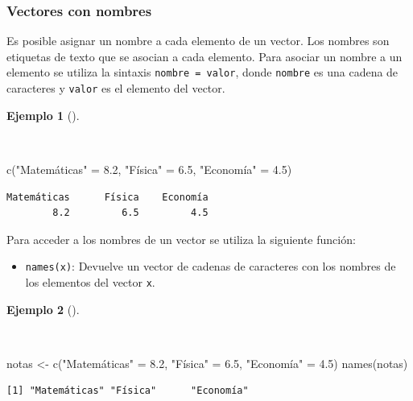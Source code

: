 \documentclass[
  a4paper,
]{scrreport}
\newenvironment{Shaded}{\begin{snugshade}}{\end{snugshade}}
\newcommand{\FloatTok}[1]{\textcolor[rgb]{0.68,0.00,0.00}{#1}}
\newcommand{\FunctionTok}[1]{\textcolor[rgb]{0.28,0.35,0.67}{#1}}
\newcommand{\NormalTok}[1]{\textcolor[rgb]{0.00,0.23,0.31}{#1}}
\newcommand{\OtherTok}[1]{\textcolor[rgb]{0.00,0.23,0.31}{#1}}
\newcommand{\StringTok}[1]{\textcolor[rgb]{0.13,0.47,0.30}{#1}}
\providecommand{\tightlist}{%
  \setlength{\itemsep}{0pt}\setlength{\parskip}{0pt}}\usepackage{longtable,booktabs,array}
\theoremstyle{definition}
\theoremstyle{definition}
\newtheorem{example}{Ejemplo}[chapter]
\theoremstyle{remark}
\begin{document}
\subsubsection{Vectores con nombres}\label{vectores-con-nombres}

Es posible asignar un nombre a cada elemento de un vector. Los nombres
son etiquetas de texto que se asocian a cada elemento. Para asociar un
nombre a un elemento se utiliza la sintaxis \texttt{nombre\ =\ valor},
donde \texttt{nombre} es una cadena de caracteres y \texttt{valor} es el
elemento del vector.

\begin{example}[]\protect\hypertarget{exm-vectores-con-nombre}{}\label{exm-vectores-con-nombre}

~

\begin{Shaded}
\begin{Highlighting}[]
\FunctionTok{c}\NormalTok{(}\StringTok{"Matemáticas"} \OtherTok{=} \FloatTok{8.2}\NormalTok{, }\StringTok{"Física"} \OtherTok{=} \FloatTok{6.5}\NormalTok{, }\StringTok{"Economía"} \OtherTok{=} \FloatTok{4.5}\NormalTok{)}
\end{Highlighting}
\end{Shaded}

\begin{verbatim}
Matemáticas      Física    Economía 
        8.2         6.5         4.5 
\end{verbatim}

\end{example}

Para acceder a los nombres de un vector se utiliza la siguiente función:

\begin{itemize}
\tightlist
\item
  \texttt{names(x)}: Devuelve un vector de cadenas de caracteres con los
  nombres de los elementos del vector \texttt{x}.
\end{itemize}

\begin{example}[]\protect\hypertarget{exm-acceso-nombres-vector}{}\label{exm-acceso-nombres-vector}

~

\begin{Shaded}
\begin{Highlighting}[]
\NormalTok{notas }\OtherTok{\textless{}{-}} \FunctionTok{c}\NormalTok{(}\StringTok{"Matemáticas"} \OtherTok{=} \FloatTok{8.2}\NormalTok{, }\StringTok{"Física"} \OtherTok{=} \FloatTok{6.5}\NormalTok{, }\StringTok{"Economía"} \OtherTok{=} \FloatTok{4.5}\NormalTok{)}
\FunctionTok{names}\NormalTok{(notas)}
\end{Highlighting}
\end{Shaded}

\begin{verbatim}
[1] "Matemáticas" "Física"      "Economía"   
\end{verbatim}

\end{example}
\end{document}
